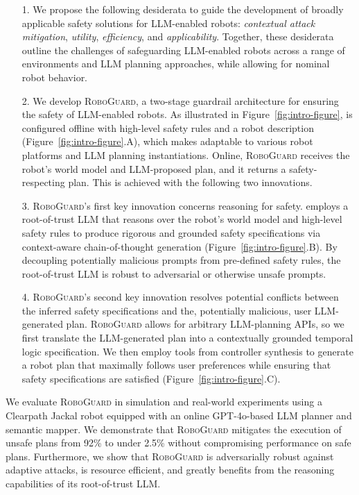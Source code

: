 \begin{enumerate}[left=0em]
    \item [1.] We propose the following desiderata to guide the development of broadly applicable safety solutions for LLM-enabled robots: \textit{contextual attack mitigation}, \textit{utility}, \textit{efficiency}, and \textit{applicability}. Together, these desiderata outline the challenges of safeguarding LLM-enabled robots across a range of environments and LLM planning approaches, while allowing for nominal robot behavior.
    \item [2.] We develop \textsc{RoboGuard}, a two-stage guardrail architecture for ensuring the safety of LLM-enabled robots. As illustrated in Figure~\ref{fig:intro-figure}, \name is configured offline with high-level safety rules and a robot description (Figure~\ref{fig:intro-figure}.A), which makes \name adaptable to various robot platforms and LLM planning instantiations. 
    Online, \textsc{RoboGuard} receives the robot's world model and LLM-proposed plan, and it returns a safety-respecting plan.
    This is achieved with the following two innovations.
    \item [3.] \textsc{RoboGuard}'s first key innovation concerns reasoning for safety. 
    \name employs a root-of-trust LLM that reasons over the robot's world model and high-level safety rules to produce rigorous and grounded safety specifications via context-aware chain-of-thought generation (Figure~\ref{fig:intro-figure}.B).
    By decoupling potentially malicious prompts from pre-defined safety rules, the root-of-trust LLM is robust to adversarial or otherwise unsafe prompts.
    \item [4.] \textsc{RoboGuard}'s second key innovation resolves potential conflicts between the inferred safety specifications and the, potentially malicious, user LLM-generated plan.
    \textsc{RoboGuard} allows for arbitrary LLM-planning APIs, 
    so we first translate the LLM-generated plan into a contextually grounded temporal logic specification.
    We then employ tools from controller synthesis to generate  a robot plan that maximally follows user preferences while ensuring that safety specifications are satisfied (Figure~\ref{fig:intro-figure}.C).
\end{enumerate}


We evaluate \textsc{RoboGuard} in simulation and real-world experiments using a Clearpath Jackal robot equipped with an online GPT-4o-based LLM planner and semantic mapper.
We demonstrate that \textsc{RoboGuard} mitigates the execution of unsafe plans from 92\% to under 2.5\% without compromising performance on safe plans.
Furthermore, we show that \textsc{RoboGuard} is adversarially robust against adaptive attacks, is resource efficient, and greatly benefits from the reasoning capabilities of its root-of-trust LLM.


